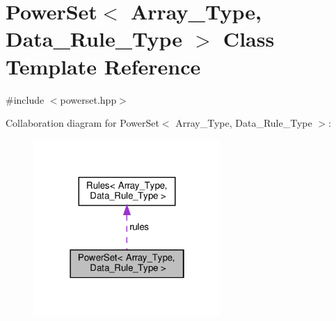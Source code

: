 \hypertarget{class_power_set}{}\section{Power\+Set$<$ Array\+\_\+\+Type, Data\+\_\+\+Rule\+\_\+\+Type $>$ Class Template Reference}
\label{class_power_set}


{\ttfamily \#include $<$powerset.\+hpp$>$}



Collaboration diagram for Power\+Set$<$ Array\+\_\+\+Type, Data\+\_\+\+Rule\+\_\+\+Type $>$\+:\nopagebreak
\begin{figure}[H]
\begin{center}
\leavevmode
\includegraphics[width=202pt]{class_power_set__coll__graph}
\end{center}
\end{figure}
